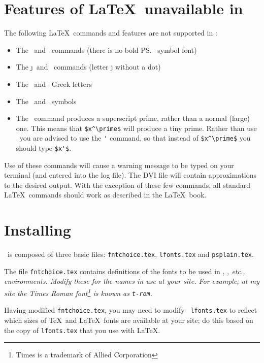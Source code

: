 \section{Features of \LaTeX\ unavailable in
\pslatex}\label{restrictions}

The following \LaTeX\ commands and features are not supported in
\pslatex: 
\begin{itemize}
\item
	The \cs\boldmath\ and \cs\unboldmath\ commands (there is no
	bold \ps\ symbol font)
\item
	The \cs\j\ and \cs\jmath\ commands (letter j without a dot)
\item
	The \cs\varepsilon\ and \cs\varrho\ Greek letters
\item
	The \cs\Longleftarrow\ and \cs\Longrightarrow\ symbols
\item
	The \cs\prime\ command produces a superscript prime, rather
	than a normal (large) one.  This means that \verb;$x^\prime$;
	will produce a tiny prime.  Rather than use \cs\prime\ you are
	advised to use the \verb;'; command, so that instead of
	\verb;$x^\prime$; you should type \verb;$x'$;.
\end{itemize}
Use of these commands will cause a warning message to be typed on your
terminal (and entered into the log file).  The DVI file will contain
approximations to the desired output.  With the exception of these few
commands, all standard \LaTeX\ commands should work as described in
the \LaTeX\ book.



\section{Installing \pslatex}\label{install}

\pslatex\ is composed of three basic files: {\tt fntchoice.tex},
{\tt lfonts.tex} and {\tt psplain.tex}.  

The file {\tt fntchoice.tex} contains definitions of the fonts to be
used in \cs\rm, \cs\it, etc., environments.  Modify these for the
names in use at your site.  For example, at my site the Times Roman
font\footnote{Times is a trademark of Allied Corporation} is known as
{\tt t-rom}.  

Having modified {\tt fntchoice.tex}, you may need to modify {\tt
lfonts.tex} to reflect which sizes of \TeX\ and \LaTeX\ fonts are
available at your site; do this based on the copy of {\tt lfonts.tex}
that you use with \LaTeX.

